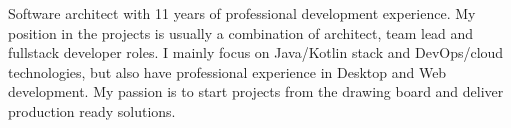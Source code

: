 

\begin{cvparagraph}

  Software architect with 11 years of professional development experience. My position in the projects is usually a combination of architect, team lead and fullstack developer roles. I mainly focus on Java/Kotlin stack and DevOps/cloud technologies, but also have professional experience in Desktop and Web development. My passion is to start projects from the drawing board and deliver production ready solutions.
\end{cvparagraph}
